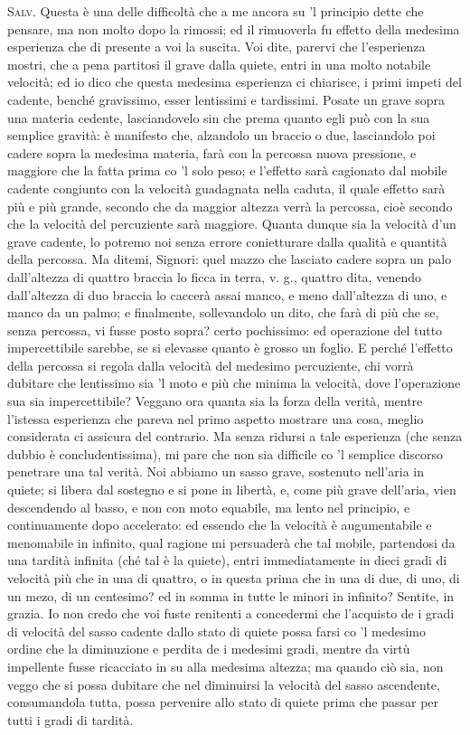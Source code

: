 \documentclass[11pt,twoside,openany]{book}
\newcommand{\speaker}[1]{\textcolor{rubric}{\textsc{#1}}\space}
\begin{document}
\speaker{Salv.} Questa è una delle difficoltà che a me ancora su 'l principio dette che pensare, ma non molto dopo la rimossi; ed il rimuoverla fu effetto della medesima esperienza che di presente a voi la suscita. Voi dite, parervi che l'esperienza mostri, che a pena partitosi il grave dalla quiete, entri in una molto notabile velocità; ed io dico che questa medesima esperienza ci chiarisce, i primi impeti del cadente, benché gravissimo, esser lentissimi e tardissimi. Posate un grave sopra una materia cedente, lasciandovelo sin che prema quanto egli può con la sua semplice gravità: è manifesto che, alzandolo un braccio o due, lasciandolo poi cadere sopra la medesima materia, farà con la percossa nuova pressione, e maggiore che la fatta prima co 'l solo peso; e l'effetto sarà cagionato dal mobile cadente congiunto con la velocità guadagnata nella caduta, il quale effetto sarà più e più grande, secondo che da maggior altezza verrà la percossa, cioè secondo che la velocità del percuziente sarà maggiore. Quanta dunque sia la velocità d'un grave cadente, lo potremo noi senza errore conietturare dalla qualità e quantità della percossa. Ma ditemi, Signori: quel mazzo che lasciato cadere sopra un palo dall'altezza di quattro braccia lo ficca in terra, v. g., quattro dita, venendo dall'altezza di duo braccia lo caccerà assai manco, e meno dall'altezza di uno, e manco da un palmo; e finalmente, sollevandolo un dito, che farà di più che se, senza percossa, vi fusse posto sopra? certo pochissimo: ed operazione del tutto impercettibile sarebbe, se si elevasse quanto è grosso un foglio. E perché l'effetto della percossa si regola dalla velocità del medesimo percuziente, chi vorrà dubitare che lentissimo sia 'l moto e più che minima la velocità, dove l'operazione sua sia impercettibile? Veggano ora quanta sia la forza della verità, mentre l'istessa esperienza che pareva nel primo aspetto mostrare una cosa, meglio considerata ci assicura del contrario. Ma senza ridursi a tale esperienza (che senza dubbio è concludentissima), mi pare che non sia difficile co 'l semplice discorso penetrare una tal verità. Noi abbiamo un sasso grave, sostenuto nell'aria in quiete; si libera dal sostegno e si pone in libertà, e, come più grave dell'aria, vien descendendo al basso, e non con moto equabile, ma lento nel principio, e continuamente dopo accelerato: ed essendo che la velocità è augumentabile e menomabile in infinito, qual ragione mi persuaderà che tal mobile, partendosi da una tardità infinita (ché tal è la quiete), entri immediatamente in dieci gradi di velocità più che in una di quattro, o in questa prima che in una di due, di uno, di un mezo, di un centesimo? ed in somma in tutte le minori in infinito? Sentite, in grazia. Io non credo che voi fuste renitenti a concedermi che l'acquisto de i gradi di velocità del sasso cadente dallo stato di quiete possa farsi co 'l medesimo ordine che la diminuzione e perdita de i medesimi gradi, mentre da virtù impellente fusse ricacciato in su alla medesima altezza; ma quando ciò sia, non veggo che si possa dubitare che nel diminuirsi la velocità del sasso ascendente, consumandola tutta, possa pervenire allo stato di quiete prima che passar per tutti i gradi di tardità.
\end{document}
